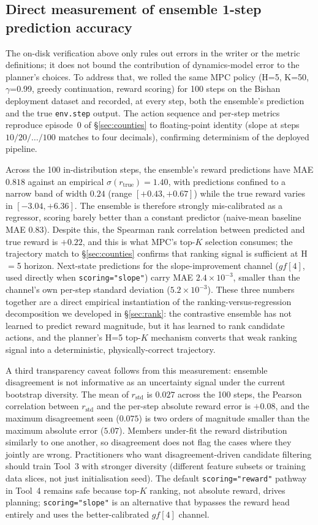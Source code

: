 \documentclass[11pt]{article}
\begin{document}
\subsection{Direct measurement of ensemble 1-step prediction accuracy}\label{sec:methods-mae}

The on-disk verification above only rules out errors in the writer or the metric definitions; it does not bound the contribution of dynamics-model error to the planner's choices. To address that, we rolled the same MPC policy (H=5, K=50, $\gamma$=0.99, greedy continuation, reward scoring) for 100 steps on the Bishan deployment dataset and recorded, at every step, both the ensemble's prediction and the true \texttt{env.step} output. The action sequence and per-step metrics reproduce episode~0 of \S\ref{sec:counties} to floating-point identity (slope at steps $10/20/\dots/100$ matches to four decimals), confirming determinism of the deployed pipeline.

Across the 100 in-distribution steps, the ensemble's reward predictions have MAE $0.818$ against an empirical $\sigma(r_{\text{true}})=1.40$, with predictions confined to a narrow band of width $0.24$ (range $[+0.43, +0.67]$) while the true reward varies in $[-3.04, +6.36]$. The ensemble is therefore strongly mis-calibrated as a regressor, scoring barely better than a constant predictor (naive-mean baseline MAE $0.83$). Despite this, the Spearman rank correlation between predicted and true reward is $+0.22$, and this is what MPC's top-$K$ selection consumes; the trajectory match to \S\ref{sec:counties} confirms that ranking signal is sufficient at H$=$5 horizon. Next-state predictions for the slope-improvement channel ($gf[4]$, used directly when \texttt{scoring="slope"}) carry MAE $2.4\times 10^{-3}$, smaller than the channel's own per-step standard deviation ($5.2\times 10^{-3}$). These three numbers together are a direct empirical instantiation of the ranking-versus-regression decomposition we developed in \S\ref{sec:rank}: the contrastive ensemble has not learned to predict reward magnitude, but it has learned to rank candidate actions, and the planner's H=5 top-$K$ mechanism converts that weak ranking signal into a deterministic, physically-correct trajectory.

A third transparency caveat follows from this measurement: ensemble disagreement is not informative as an uncertainty signal under the current bootstrap diversity. The mean of $r_{\text{std}}$ is $0.027$ across the 100 steps, the Pearson correlation between $r_{\text{std}}$ and the per-step absolute reward error is $+0.08$, and the maximum disagreement seen ($0.075$) is two orders of magnitude smaller than the maximum absolute error ($5.07$). Members under-fit the reward distribution similarly to one another, so disagreement does not flag the cases where they jointly are wrong. Practitioners who want disagreement-driven candidate filtering should train Tool~3 with stronger diversity (different feature subsets or training data slices, not just initialisation seed). The default \texttt{scoring="reward"} pathway in Tool~4 remains safe because top-$K$ ranking, not absolute reward, drives planning; \texttt{scoring="slope"} is an alternative that bypasses the reward head entirely and uses the better-calibrated $gf[4]$ channel.
\end{document}
